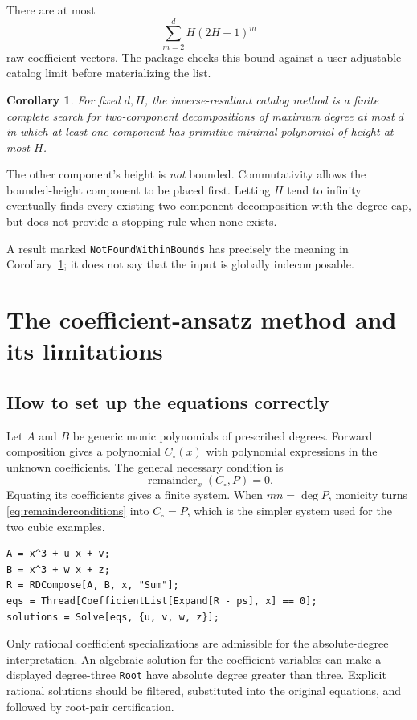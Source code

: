 \documentclass[11pt,letterpaper]{article}
\newtheorem{corollary}[theorem]{Corollary}
\theoremstyle{definition}
\newcommand{\code}[1]{\texttt{#1}}
\begin{document}
There are at most
\[
 \sum_{m=2}^{d}H(2H+1)^m
\]
raw coefficient vectors. The package checks this bound against a user-adjustable catalog limit before materializing the list.

\begin{corollary}\label{cor:bounded}
For fixed $d,H$, the inverse-resultant catalog method is a finite complete search for two-component decompositions of maximum degree at most $d$ in which at least one component has primitive minimal polynomial of height at most $H$.
\end{corollary}
The other component's height is \emph{not} bounded. Commutativity allows the bounded-height component to be placed first. Letting $H$ tend to infinity eventually finds every existing two-component decomposition with the degree cap, but does not provide a stopping rule when none exists.

A result marked \code{NotFoundWithinBounds} has precisely the meaning in Corollary~\ref{cor:bounded}; it does not say that the input is globally indecomposable.

\section{The coefficient-ansatz method and its limitations}
\subsection{How to set up the equations correctly}
Let $A$ and $B$ be generic monic polynomials of prescribed degrees. Forward composition gives a polynomial $C_{\circ}(x)$ with polynomial expressions in the unknown coefficients. The general necessary condition is
\begin{equation}\label{eq:remainderconditions}
 \operatorname{remainder}_x(C_{\circ},P)=0.
\end{equation}
Equating its coefficients gives a finite system. When $mn=\deg P$, monicity turns \eqref{eq:remainderconditions} into $C_{\circ}=P$, which is the simpler system used for the two cubic examples.

\begin{samepage}
\begin{lstlisting}
A = x^3 + u x + v;
B = x^3 + w x + z;
R = RDCompose[A, B, x, "Sum"];
eqs = Thread[CoefficientList[Expand[R - ps], x] == 0];
solutions = Solve[eqs, {u, v, w, z}];
\end{lstlisting}
\end{samepage}
Only rational coefficient specializations are admissible for the absolute-degree interpretation. An algebraic solution for the coefficient variables can make a displayed degree-three \code{Root} have absolute degree greater than three. Explicit rational solutions should be filtered, substituted into the original equations, and followed by root-pair certification.
\end{document}
